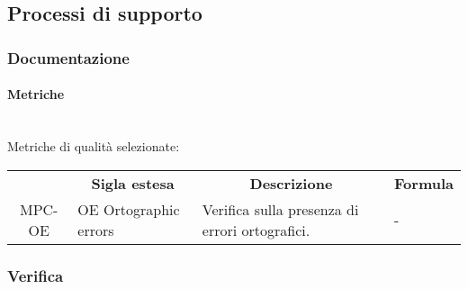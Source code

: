\subsection{Processi di supporto}
\subsubsection{Documentazione}
\paragraph{Metriche}\mbox{}\\
Metriche di qualità selezionate:
\begin{table}[H]
    \centering
    \renewcommand{\arraystretch}{1.8}
    \begin{tabular}{| c | p{4.2cm} | p{5cm} | p{2cm} |  }
        \rowcolor[HTML]{a52a2a}
        \multicolumn{1}{c}{\color[HTML]{FFFFFF} \textbf{Codice}}       &
        \multicolumn{1}{c}{\color[HTML]{FFFFFF} \textbf{Sigla estesa}} &
        \multicolumn{1}{c}{\color[HTML]{FFFFFF} \textbf{Descrizione}}  &
        \multicolumn{1}{c}{\color[HTML]{FFFFFF} \textbf{Formula}}                                                                  \\
        MPC-OE                                                         & OE Ortographic errors & Verifica sulla presenza di errori
        ortografici.                                                   & -                                                         \\
        \hline
    \end{tabular}
\end{table}
\subsubsection{Verifica}

